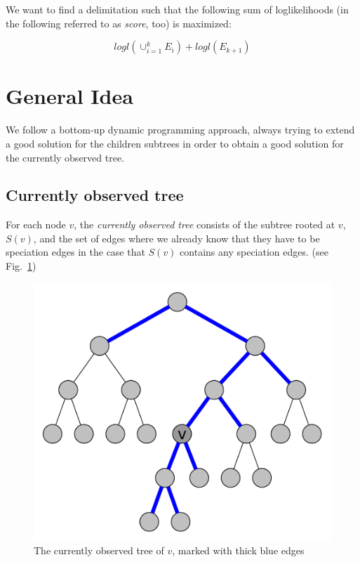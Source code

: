 \documentclass{llncs}
\begin{document}
We want to find a delimitation such that the following sum of loglikelihoods (in the following referred to as \emph{score}, too) is maximized:

$$logl(\cup_{i=1}^k{E_i}) + logl(E_{k+1})$$

\section{General Idea}

We follow a bottom-up dynamic programming approach, always trying to extend a good solution for the children subtrees in order to obtain a good solution for the currently observed tree.

\subsection{Currently observed tree}

For each node $v$, the \emph{currently observed tree} consists of the subtree rooted at $v$, $S(v)$, and the set of edges where we already know that they have to be speciation edges in the case that $S(v)$ contains any speciation edges. (see Fig.~\ref{fig:currently_observed_tree})

\begin{figure}[h!]
	\centering
	\includegraphics[scale=0.4]{images/currently_observed_tree.pdf}
	\caption{The currently observed tree of $v$, marked with thick blue edges}
	\label{fig:currently_observed_tree}
\end{figure}
\end{document}

